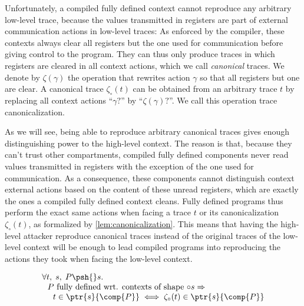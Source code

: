 \documentclass[10pt, conference, compsocconf, letterpaper, times]{IEEEtran}
\begin{document}
Unfortunately, a compiled fully defined context cannot reproduce
any arbitrary low-level trace, because the values transmitted
in registers are part of external communication actions in low-level
traces:
As enforced by the compiler, these contexts always clear all
registers but the one used for communication before giving control to
the program.
They can thus only produce traces in which registers are
cleared in all context actions, which we call \emph{canonical} traces.
We denote by $\zeta(\gamma)$ the operation that rewrites action
$\gamma$ so that all registers but one are clear.
A canonical trace $\zeta_{\circ}(t)$ can be obtained from an arbitrary
trace $t$ by replacing all context actions ``$\gamma?$'' by
``$\zeta(\gamma)?$''.
We call this operation trace canonicalization.

As we will see, being able to reproduce arbitrary canonical
traces gives enough distinguishing power to the high-level context.
The reason is that, because they can't trust other compartments,
compiled fully defined components never read values transmitted in
registers with the exception of the one used for communication.
As a consequence, these components cannot distinguish context external actions
based on the content of these unread registers, which are exactly the
ones a compiled fully defined context cleans.
Fully defined programs thus perform the exact same actions when facing
a trace $t$ or its canonicalization $\zeta_{\circ}(t)$,
as formalized by \autoref{lem:canonicalization}.
This means that having the high-level attacker reproduce canonical
traces instead of the original traces of the low-level context will be
enough to lead compiled programs into reproducing the actions they took when
facing the low-level context.

\begin{lemma}[Canonicalization]
\label{lem:canonicalization}
\[
\begin{array}{l}
\forall t,\; s,\; P \psh{}s. \\
~~
P\text{ fully defined wrt. contexts of shape }{\circ}s \Rightarrow \\
~~~~  t \in \ptr{s}{\comp{P}} \iff \zeta_{\circ}(t) \in \ptr{s}{\comp{P}}
\end{array}
\]
\end{lemma}

\ifsooner
{}
\fi
\end{document}
